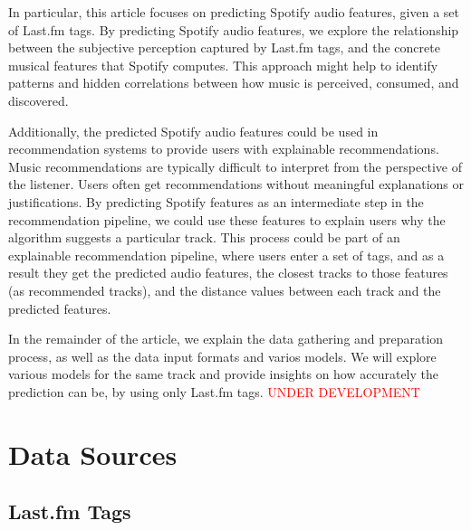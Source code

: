 \documentclass[sn-mathphys]{sn-jnl}%
\theoremstyle{thmstyleone}%
\theoremstyle{thmstyletwo}%
\theoremstyle{thmstylethree}%
\begin{document}
In particular, this article focuses on predicting Spotify audio features, given a set of Last.fm tags.
By predicting Spotify audio features, we explore the relationship between the subjective perception captured by Last.fm tags, and the concrete musical features that Spotify computes.
This approach might help to identify patterns and hidden correlations between how music is perceived, consumed, and discovered.

Additionally, the predicted Spotify audio features could be used in recommendation systems to provide users with explainable recommendations.
Music recommendations are typically difficult to interpret from the perspective of the listener.
Users often get recommendations without meaningful explanations or justifications.
By predicting Spotify features as an intermediate step in the recommendation pipeline, we could use these features to explain users why the algorithm suggests a particular track.
This process could be part of an explainable recommendation pipeline, where users enter a set of tags,
and as a result they get the predicted audio features, the closest tracks to those features (as recommended tracks), and the distance values between each track and the predicted features.


In the remainder of the article, we explain the data gathering and preparation process, as well as the data input formats and varios models.
We will explore various models for the same track and provide insights on how accurately the prediction can be, by using only Last.fm tags.
\textcolor{red}{UNDER DEVELOPMENT}

\section{Data Sources}

\subsection{Last.fm Tags}
\end{document}
